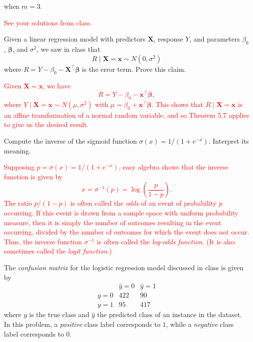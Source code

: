 \documentclass[12pt,reqno]{amsart}
\begin{document}
when $m=3$.

\bigskip
\textcolor{red}{See your solutions from class.}
\bigskip













\prob Given a linear regression model with predictors $\mathbf{X}$, response $Y$, and parameters $\beta_0$, $\boldsymbol{\beta}$, and $\sigma^2$, we saw in class that
	\[ R \mid \mathbf{X} = \mathbf{x} \sim N(0, \sigma^2)
	\]
where $R = Y - \beta_0 - \mathbf{X}^\intercal \boldsymbol{\beta}$ is the error term. Prove this claim.

\bigskip
\textcolor{red}{Given $\mathbf{X} = \mathbf{x}$, we have
	\[R = Y - \beta_0 - \mathbf{x}^\intercal \boldsymbol{\beta},
	\]
where $Y \mid \mathbf{X} = \mathbf{x} \sim N(\mu,\sigma^2)$ with $\mu = \beta_0 + \mathbf{x}^\intercal \boldsymbol{\beta}$. This shows that $R \mid \mathbf{X} = \mathbf{x}$ is an affine transformation of a normal random variable, and so Theorem 5.7 applies to give us the desired result.}
\bigskip










\prob Compute the inverse of the sigmoid function $\sigma(x) = 1/(1+e^{-x})$. Interpret its meaning.

\bigskip
\textcolor{red}{Supposing $p = \sigma(x) = 1 / (1+e^{-x})$, easy algebra shows that the inverse function is given by
	\[x = \sigma^{-1}(p) = \log\left( \frac{p}{1-p} \right).
	\]
The ratio $p/(1-p)$ is often called the \textit{odds} of an event of probability $p$ occurring. If this event is drawn from a sample space with uniform probability measure, then it is simply the number of outcomes resulting in the event occurring, divided by the number of outcomes for which the event does not occur. Thus, the inverse function $\sigma^{-1}$ is often called the \textit{log-odds function}. (It is also sometimes called the \textit{logit function}.)}
\bigskip












\prob The \textit{confusion matrix} for the logistic regression model discussed in class is given by
	\[\begin{array}{c|cc}
	& \hat{y}=0 & \hat{y} = 1 \\ \hline
	y=0 & 422 & 90 \\
	y=1 & 95 & 417
	\end{array}
	\]
where $y$ is the true class and $\hat{y}$ the predicted class of an instance in the dataset. In this problem, a \textit{positive} class label corresponds to $1$, while a \textit{negative} class label corresponds to $0$.
\end{document}
